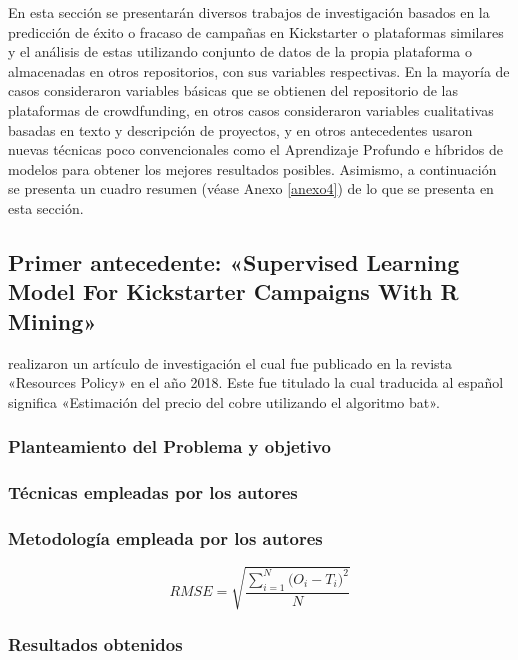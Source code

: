 En esta sección se presentarán diversos trabajos de investigación basados en la predicción de éxito o fracaso de campañas en Kickstarter o plataformas similares y el análisis de estas utilizando conjunto de datos de la propia plataforma o almacenadas en otros repositorios, con sus variables respectivas. En la mayoría de casos consideraron variables básicas que se obtienen del repositorio de las plataformas de crowdfunding, en otros casos consideraron variables cualitativas basadas en texto y descripción de proyectos, y en otros antecedentes usaron nuevas técnicas poco convencionales como el Aprendizaje Profundo e híbridos de modelos para obtener los mejores resultados posibles.
Asimismo, a continuación se presenta un cuadro resumen (véase Anexo \ref{anexo4}) de lo que se presenta en esta sección.

\subsection{Primer antecedente: «Supervised Learning Model For Kickstarter Campaigns With R Mining» \citep*{pr_kamath2018suplearn}}
\citeauthor{pr_kamath2018suplearn} realizaron un artículo de investigación el cual fue publicado en la revista «Resources Policy» en el año 2018. Este fue titulado  la cual traducida al español significa «Estimación del precio del cobre utilizando el algoritmo bat».

\subsubsection{Planteamiento del Problema y objetivo }


\subsubsection{Técnicas empleadas por los autores}
 

\subsubsection{Metodología empleada por los autores}

\begin{equation}  
\label{eq:RMSE}
RMSE = \sqrt{\frac{\sum_{i=1}^{N}{\Big(O_i -T_i\Big)^2}}{N}}
\end{equation}


\subsubsection{Resultados obtenidos}



